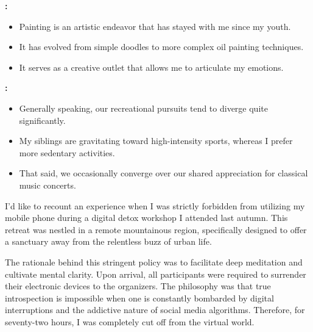 
\textbf{:}

\begin{itemize}
\tightlist
\item
  Painting is an artistic endeavor that has stayed with me since my
  youth.
\item
  It has evolved from simple doodles to more complex oil painting
  techniques.
\item
  It serves as a creative outlet that allows me to articulate my
  emotions.
\end{itemize}


\textbf{:}

\begin{itemize}
\tightlist
\item
  Generally speaking, our recreational pursuits tend to diverge quite
  significantly.
\item
  My siblings are gravitating toward high-intensity sports, whereas I
  prefer more sedentary activities.
\item
  That said, we occasionally converge over our shared appreciation for
  classical music concerts.
\end{itemize}


\begingroup\setlength{\cdpromptbeforeskip}{34pt}\endgroup

I'd like to recount an experience when I was strictly forbidden from
utilizing my mobile phone during a digital detox workshop I attended
last autumn. This retreat was nestled in a remote mountainous region,
specifically designed to offer a sanctuary away from the relentless buzz
of urban life.

The rationale behind this stringent policy was to facilitate deep
meditation and cultivate mental clarity. Upon arrival, all participants
were required to surrender their electronic devices to the organizers.
The philosophy was that true introspection is impossible when one is
constantly bombarded by digital interruptions and the addictive nature
of social media algorithms. Therefore, for seventy-two hours, I was
completely cut off from the virtual world.

